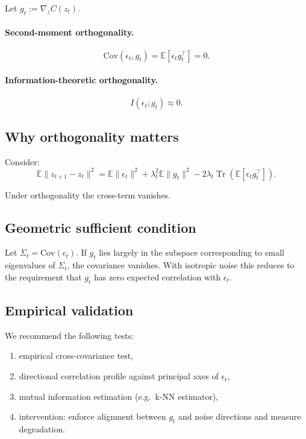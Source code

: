 \documentclass[11pt]{article}
\begin{document}
Let $g_t := \nabla_z C(z_t)$.

\paragraph{Second-moment orthogonality.}
\begin{equation}
\mathrm{Cov}(\epsilon_t, g_t) = \mathbb{E}[\epsilon_t g_t^\top] = 0.
\end{equation}

\paragraph{Information-theoretic orthogonality.}
\[
I(\epsilon_t; g_t) \approx 0.
\]

\subsection{Why orthogonality matters}

Consider:
\[
\mathbb{E}\|z_{t+1}-z_t\|^2
= \mathbb{E}\|\epsilon_t\|^2 + \lambda_t^2 \mathbb{E}\|g_t\|^2
- 2\lambda_t \operatorname{Tr}(\mathbb{E}[\epsilon_t g_t^\top]).
\]

Under orthogonality the cross-term vanishes.

\subsection{Geometric sufficient condition}

Let $\Sigma_t = \mathrm{Cov}(\epsilon_t)$. If $g_t$ lies largely in the subspace 
corresponding to small eigenvalues of $\Sigma_t$, the covariance vanishes.  
With isotropic noise this reduces to the requirement that $g_t$ has zero expected 
correlation with $\epsilon_t$.

\subsection{Empirical validation}

We recommend the following tests:
\begin{enumerate}[itemsep=3pt]
    \item empirical cross-covariance test,
    \item directional correlation profile against principal axes of $\epsilon_t$,
    \item mutual information estimation (e.g.\ k-NN estimator),
    \item intervention: enforce alignment between $g_t$ and noise directions and measure degradation.
\end{enumerate}
\end{document}
